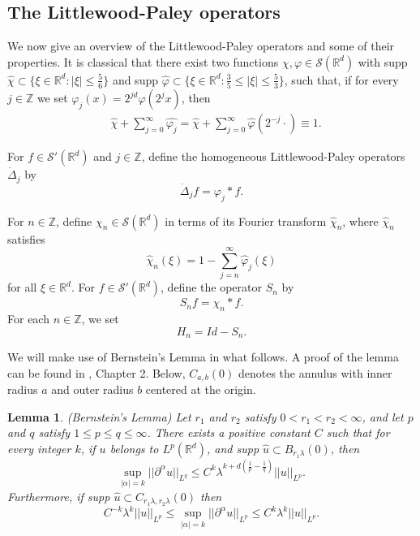 \documentclass[11pt,reqno,xcolor=svgnames]{amsart}
\def\R{{\mathbb R}}
\def\Z{{\mathbb Z}}
\theoremstyle{plain}
\newtheorem{lem}[theorem]{Lemma}
\theoremstyle{definition}
\theoremstyle{plain}
\theoremstyle{remark}
\newcommand{\wh}{\widehat}
\begin{document}
\subsection{The Littlewood-Paley operators}\label{S:LPOperators}
We now give an overview of the Littlewood-Paley operators and some of their properties.  It is classical that there exist two functions ${\chi}, {\varphi} \in \mathcal{S}(\R^d)$ with supp $\wh{\chi}\subset \{\xi\in \R^d: |\xi |\leq \frac{5}{6} \}$ and supp $\wh{\varphi}\subset \{\xi\in \R^d: \frac{3}{5} \leq|\xi |\leq \frac{5}{3} \}$, such that, if for every $j\in\Z$ we set $\varphi_j(x) = 2^{jd} \varphi(2^j x)$, then
\begin{equation*}
\begin{split}
	&\wh{\chi}+ \sum_{j=0}^{\infty} \wh{\varphi_j}
		= \wh{\chi} + \sum_{j=0}^{\infty} \wh{\varphi}(2^{-j} \cdot) 
		\equiv 1.
\end{split}
\end{equation*}

For $f\in \mathcal{S}'(\R^d)$ and $j\in\Z$, 
define the homogeneous Littlewood-Paley operators $\dot{\Delta}_j$ by
\begin{equation*}
    \dot{\Delta}_j f = {\varphi}_j \ast f.
\end{equation*}  


For $n\in\Z$, define ${\chi}_n \in \mathcal{S}(\R^d)$ in terms of its Fourier transform ${\wh{\chi}}_n$, where ${\wh{\chi}}_n$ satisfies 
\begin{equation*}
{\wh{\chi}}_n (\xi) =   1 - \sum_{j=n }^{\infty} \wh{\varphi}_j(\xi)
\end{equation*}
for all $\xi\in\R^d$. For $f\in\mathcal{S}'(\R^d)$, define the operator $S_n$ by  
\begin{equation*}
S_n f = {\chi}_n \ast f.
\end{equation*}
For each $n\in\Z$, we set $$H_n = Id - S_n.$$

We will make use of Bernstein's Lemma in what follows.  A proof of the lemma can be found in \cite{Chemin1}, Chapter 2.  Below, $C_{a,b}(0)$ denotes the annulus with inner radius $a$ and outer radius $b$ centered at the origin.  
\begin{lem}\label{bernstein}
(Bernstein's Lemma) Let $r_1$ and $r_2$ satisfy $0<r_1<r_2<\infty$, and let $p$ and $q$ satisfy $1\leq p \leq q \leq \infty$. There exists a positive constant $C$ such that for every integer $k$, if $u$ belongs to $L^p(\R^d)$, and supp $\wh{u}\subset B_{r_1\lambda}(0)$, then 
\begin{equation}\label{bern1}
\sup_{|\alpha|=k} ||\partial^{\alpha}u||_{L^q} \leq C^k{\lambda}^{k+d(\frac{1}{p}-\frac{1}{q})}||u||_{L^p}.
\end{equation}
Furthermore, if supp $\wh{u}\subset C_{r_1\lambda, r_2\lambda}(0)$ then 
\begin{equation}\label{bern2}
C^{-k}{\lambda}^k||u||_{L^p} \leq \sup_{|\alpha|=k}||\partial^{\alpha}u||_{L^p} \leq C^{k}{\lambda}^k||u||_{L^p}.
\end{equation} 
\end{lem}
\end{document}
